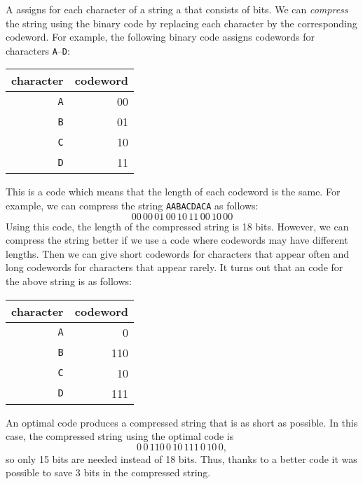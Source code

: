 
A  assigns for each character
of a string a  that consists of bits.
We can \emph{compress} the string using the binary code
by replacing each character by the
corresponding codeword.
For example, the following binary code
assigns codewords for characters
\texttt{A}–\texttt{D}:
\begin{center}
\begin{tabular}{rr}
character & codeword \\
\hline
\texttt{A} & 00 \\
\texttt{B} & 01 \\
\texttt{C} & 10 \\
\texttt{D} & 11 \\
\end{tabular}
\end{center}
This is a  code
which means that the length of each
codeword is the same.
For example, we can compress the string
\texttt{AABACDACA} as follows:
\[00\,00\,01\,00\,10\,11\,00\,10\,00\]
Using this code, the length of the compressed
string is 18 bits.
However, we can compress the string better
if we use a  code
where codewords may have different lengths.
Then we can give short codewords for
characters that appear often
and long codewords for characters
that appear rarely.
It turns out that an  code
for the above string is as follows:
\begin{center}
\begin{tabular}{rr}
character & codeword \\
\hline
\texttt{A} & 0 \\
\texttt{B} & 110 \\
\texttt{C} & 10 \\
\texttt{D} & 111 \\
\end{tabular}
\end{center}
An optimal code produces a compressed string
that is as short as possible.
In this case, the compressed string using
the optimal code is
\[0\,0\,110\,0\,10\,111\,0\,10\,0,\]
so only 15 bits are needed instead of 18 bits.
Thus, thanks to a better code it was possible to
save 3 bits in the compressed string.

